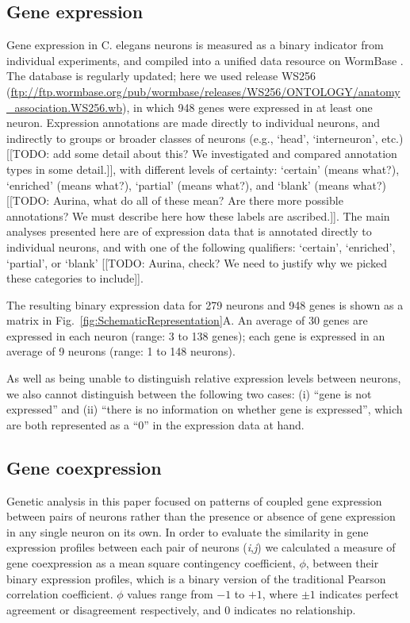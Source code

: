 \documentclass[10pt,letterpaper]{article}
\begin{document}
\subsection*{Gene expression}

Gene expression in C. elegans neurons is measured as a binary indicator from individual experiments, and compiled into a unified data resource on WormBase \cite{Harris:2009kd}.
The database is regularly updated; here we used release WS256 (\url{ftp://ftp.wormbase.org/pub/wormbase/releases/WS256/ONTOLOGY/anatomy_association.WS256.wb}), in which 948 genes were expressed in at least one neuron.
Expression annotations are made directly to individual neurons, and indirectly to groups or broader classes of neurons (e.g., `head', `interneuron', etc.) [[TODO: add some detail about this? We investigated and compared annotation types in some detail.]], with different levels of certainty: `certain' (means what?), `enriched' (means what?), `partial' (means what?), and `blank' (means what?) [[TODO: Aurina, what do all of these mean? Are there more possible annotations? We must describe here how these labels are ascribed.]].
The main analyses presented here are of expression data that is annotated directly to individual neurons, and with one of the following qualifiers: `certain', `enriched', `partial', or `blank' [[TODO: Aurina, check? We need to justify why we picked these categories to include]].

The resulting binary expression data for 279 neurons and 948 genes is shown as a matrix in Fig.~\ref{fig:SchematicRepresentation}A.
An average of 30 genes are expressed in each neuron (range: 3 to 138 genes); each gene is expressed in an average of 9 neurons (range: 1 to 148 neurons).

As well as being unable to distinguish relative expression levels between neurons, we also cannot distinguish between the following two cases: (i) ``gene is not expressed'' and (ii) ``there is no information on whether gene is expressed'', which are both represented as a ``0'' in the expression data at hand.


\subsection*{Gene coexpression}
Genetic analysis in this paper focused on patterns of coupled gene expression between pairs of neurons rather than the presence or absence of gene expression in any single neuron on its own.
In order to evaluate the similarity in gene expression profiles between each pair of neurons (\textit{i},\textit{j}) we calculated a measure of gene coexpression as a mean square contingency coefficient, $\phi$, between their binary expression profiles, which is a binary version of the traditional Pearson correlation coefficient.
$\phi$ values range from $-1$ to $+1$, where $\pm1$ indicates perfect agreement or disagreement respectively, and 0 indicates no relationship.
\end{document}
